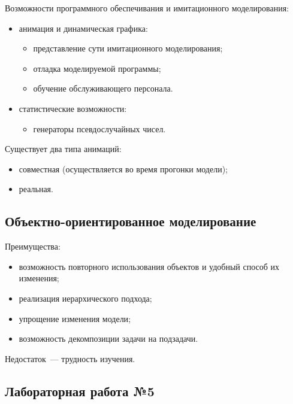 Возможности программного обеспечивания и имитационного моделирования:

\begin{itemize}
    \item анимация и динамическая графика:
          \begin{itemize}
              \item представление сути имитационного моделирования;
              \item отладка моделируемой программы;
              \item обучение обслуживающего персонала.
          \end{itemize}
    \item статистические возможности:
          \begin{itemize}
              \item генераторы псевдослучайных чисел.
          \end{itemize}
\end{itemize}

Существует два типа анимаций:

\begin{itemize}
    \item совместная (осуществляется во время прогонки модели);
    \item реальная.
\end{itemize}

\subsection{Объектно-ориентированное моделирование}

Преимущества:

\begin{itemize}
    \item возможность повторного использования объектов и удобный способ их изменения;
    \item реализация иерархического подхода;
    \item упрощение изменения модели;
    \item возможность декомпозиции задачи на подзадачи.
\end{itemize}

Недостаток~--- трудность изучения.

\subsection{Лабораторная работа №5}

